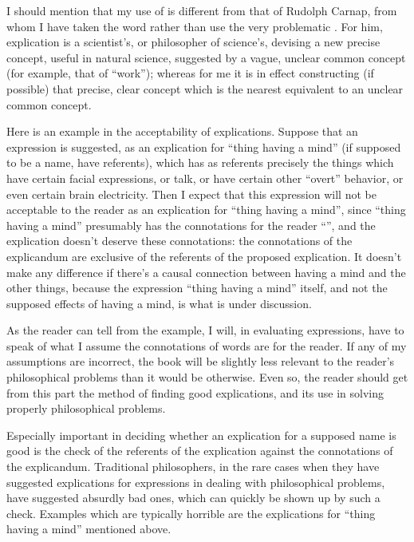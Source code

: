 I should mention that my use of  is different from that of 
Rudolph Carnap, from whom I have taken the word rather than use the very 
problematic . For him, explication is a scientist's, or philosopher 
of science's, devising a new precise concept, useful in natural science, 
suggested by a vague, unclear common concept (for example, that of 
\enquote{work}); whereas for me it is in effect constructing (if possible) that precise, 
clear concept which is the nearest equivalent to an unclear common concept. 

Here is an example in the acceptability of explications. Suppose that an 
expression is suggested, as an explication for \enquote{thing having a mind} (if 
supposed to be a name, have referents), which has as referents precisely the 
things which have certain facial expressions, or talk, or have certain other 
\enquote{overt} behavior, or even certain brain electricity. Then I expect that this 
expression will not be acceptable to the reader as an explication for \enquote{thing 
having a mind}, since \enquote{thing having a mind} presumably has the connotations 
for the reader \enquote{}, and the explication doesn't deserve these connotations: 
the connotations of the explicandum are exclusive of the referents of the 
proposed explication. It doesn't make any difference if there's a causal 
connection between having a mind and the other things, because the 
expression \enquote{thing having a mind} itself, and not the supposed effects of 
having a mind, is what is under discussion. 

As the reader can tell from the example, I will, in evaluating 
expressions, have to speak of what I assume the connotations of words are 
for the reader. If any of my assumptions are incorrect, the book will be 
slightly less relevant to the reader's philosophical problems than it would be 
otherwise. Even so, the reader should get from this part the method of 
finding good explications, and its use in solving properly philosophical 
problems. 

Especially important in deciding whether an explication for a supposed 
name is good is the check of the referents of the explication against the 
connotations of the explicandum. Traditional philosophers, in the rare cases 
when they have suggested explications for expressions in dealing with 
philosophical problems, have suggested absurdly bad ones, which can quickly 
be shown up by such a check. Examples which are typically horrible are the 
explications for \enquote{thing having a mind} mentioned above. 

